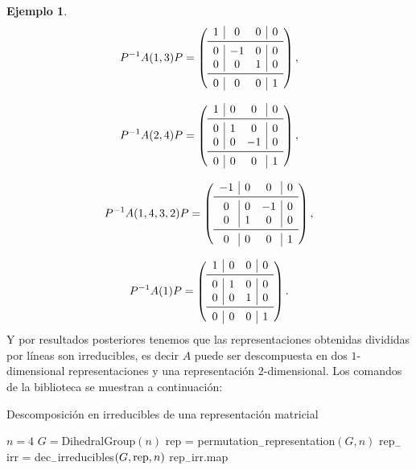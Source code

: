 \documentclass[12pt]{book}
\theoremstyle{definition}
\newtheorem{example}[theorem]{Ejemplo}
\newcounter{in}
\begin{document}
\begin{example}
\[
P^{-1}A(1, 3)P =
\left( \begin{array}{c|cc|c}
1 &  0 & 0 & 0 \\
\midrule
0 & -1 & 0 & 0 \\
0 &  0 & 1 & 0 \\
\midrule
0 &  0 & 0 & 1 \\
\end{array}\right),
\]

\[
P^{-1}A(2, 4)P =
\left( \begin{array}{c|cc|c}
1 & 0 &  0 & 0 \\
\midrule
0 & 1 &  0 & 0 \\
0 & 0 & -1 & 0 \\
\midrule
0 & 0 &  0 & 1 \\
\end{array}\right),
\]

\[
P^{-1}A(1, 4, 3, 2)P =
\left( \begin{array}{c|cc|c}
-1 & 0 &  0 & 0 \\
\midrule
 0 & 0 & -1 & 0 \\
 0 & 1 &  0 & 0 \\
\midrule
 0 & 0 &  0 & 1 \\
\end{array}\right),
\]

\[
P^{-1}A(1)P =
\left( \begin{array}{c|cc|c}
1 & 0 & 0 & 0 \\
\midrule
0 & 1 & 0 & 0 \\
0 & 0 & 1 & 0 \\
\midrule
0 & 0 & 0 & 1 \\
\end{array}\right).
\]
Y por resultados posteriores tenemos que las representaciones
obtenidas divididas por líneas son irreducibles, es decir $A$ puede
ser descompuesta en dos $1$-dimensional representaciones y una
representación $2$-dimensional. Los comandos de la biblioteca se
muestran a continuación:
\begin{algorithm}[H]
\caption{Descomposición en irreducibles de una representación matricial}
\begin{algorithmic}
\REQUIRE $n = 4$
\REQUIRE $G = $DihedralGroup$(n)$
\STATE rep = permutation$_{-}$representation$(G, n)$
\STATE rep$_{-}$irr = dec$_{-}$irreducibles$(G, \textup{rep}, n)$
\PRINT rep$_{-}$irr.map
\end{algorithmic}
\end{algorithm}
\end{example}
\end{document}
